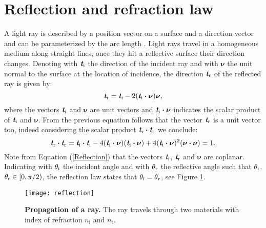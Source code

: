 \section{Reflection and refraction law}\label{sec:reflection}
A light ray is described by a position vector  on a surface and a direction vector  and can be parameterized by the arc length .
Light rays travel in a homogeneous medium along straight lines, once they hit a reflective surface their direction changes.
 Denoting with $\textit{\textbf{t}}_\textrm{i}$ the direction of the incident ray and with $\boldsymbol{\nu}$ the unit normal to the surface at the location of incidence, the direction $\textit{\textbf{t}}_\textrm{r}$ of the reflected ray is given by:
 \begin{equation}\label{Reflection}
  \textit{\textbf{t}}_\textrm{r} = \textit{\textbf{t}}_\textrm{i}-2 (\textit{\textbf{t}}_\textrm{i}\boldsymbol{\cdot}\boldsymbol{\nu})\boldsymbol{\nu},
\end{equation}
where the vectors $\textit{\textbf{t}}_\textrm{i}$ and $\boldsymbol{\nu}$ are unit vectors and $\textit{\textbf{t}}_\textrm{i}\boldsymbol{\cdot}\boldsymbol{\nu}$ indicates the scalar product of
$\textit{\textbf{t}}_\textrm{i}$ and $\boldsymbol{\nu}$. 
From the previous equation follows that the vector  $\textit{\textbf{t}}_\textrm{r}$ is a unit vector too, indeed considering the scalar product $\textit{\textbf{t}}_\textrm{r}\boldsymbol{\cdot}\textit{\textbf{t}}_\textrm{r}$ we conclude:
\begin{equation}\label{unit_vector}
\textit{\textbf{t}}_\textrm{r}\boldsymbol{\cdot}\textit{\textbf{t}}_\textrm{r} = \textit{\textbf{t}}_\textrm{i}\boldsymbol{\cdot}\textit{\textbf{t}}_\textrm{i} 
- 4(\textit{\textbf{t}}_\textrm{i}\boldsymbol{\cdot}\boldsymbol{\nu})(\textit{\textbf{t}}_\textrm{i}\boldsymbol{\cdot}\boldsymbol{\nu})+
4(\textit{\textbf{t}}_\textrm{i}\boldsymbol{\cdot}\boldsymbol{\nu})^2(\boldsymbol{\nu}\boldsymbol{\cdot}\boldsymbol{\nu})=1 .
\end{equation} 
Note from Equation (\ref{Reflection}) that the vectors $\textit{\textbf{t}}_\textrm{i}$, $\textit{\textbf{t}}_\textrm{r}$ and $\boldsymbol{\nu}$ are coplanar.
Indicating with $\theta_\textrm{i}$ the incident angle and with $\theta_\textrm{r}$ the reflective angle such that $\theta_\textrm{i}$, $\theta_\textrm{r} \in[0, \pi/2)$,
the reflection law states that $\theta_\textrm{i}=\theta_\textrm{r}$, see Figure \ref{fig:Snell}.
\begin{figure}[t]
 \label{fig:Snell}
     \begin{center}
     \texttt{[image: reflection]}
     \end{center}
     \caption{\textbf{Propagation of a ray.} The ray travels through two materials with index of refraction $n_\textrm{i}$ and $n_\textrm{t}$.}%
\label{fig:Snell}
 \end{figure}
